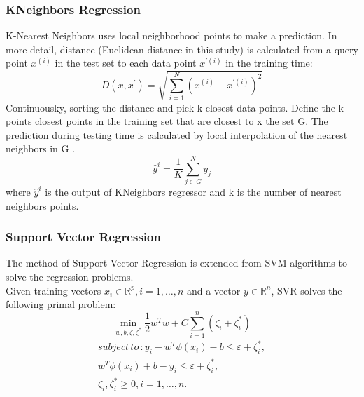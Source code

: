 \documentclass[english]{article}
\begin{document}
\subsubsection{KNeighbors Regression}
K-Nearest Neighbors uses local neighborhood points to make a prediction. In more detail, distance (Euclidean distance in this study) is calculated from a query point $x^{(i)}$ in the test set to each data point $x^{'(i)}$ in the training time:
\begin{equation}
D(x,x^{'}) = \sqrt{\sum_{i=1}^{N}(x^{(i)} - x^{'(i)})^{2}}
\end{equation}
Continuousky, sorting the distance and pick k closest data points. Define the k points closest points in the training set that are closest to x the set G. The prediction during testing time is calculated by local interpolation of the nearest neighbors in G \cite{Ristanto}.
\begin{equation}
\hat{y}^{i} = \frac{1}{K} \sum_{j\in G}^{N} y_{j}
\end{equation}
where $\hat{y}^{i}$ is the output of KNeighbors regressor and k is the number of nearest neighbors points.
\subsubsection{Support Vector Regression}
The method of Support Vector Regression is extended from SVM algorithms to solve the regression problems.\\
Given training vectors $x_{i} \in \mathbb{R}^{p}, i = 1, \ldots, n$ and a vector $y \in \mathbb{R}^{n}$, SVR solves the following primal problem:
\begin{equation}
\min_{w,b,\zeta,\zeta^{\ast}} \frac{1}{2}w^{T}w + C\sum_{i=1}^{n}(\zeta_{i} + \zeta_{i}^{\ast})
\end{equation}
\begin{align*}
subject\,to\,: y_{i} - w^{T}\phi(x_{i}) - b \leq \varepsilon + \zeta_{i}^{\ast},\\
w^{T}\phi(x_{i}) + b - y_{i} \leq \varepsilon + \zeta_{i}^{\ast},\\
\zeta_{i},\zeta_{i}^{\ast} \geq 0, i = 1,\ldots,n.
\end{align*}
\end{document}
